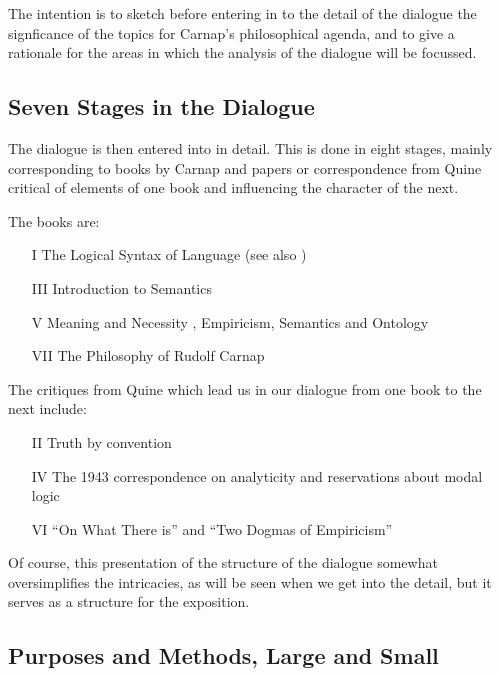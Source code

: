 The intention is to sketch before entering in to the detail of the dialogue
the signficance of the topics for Carnap's philosophical agenda, and
to give a rationale for the areas in which the analysis of the dialogue
will be focussed.

\subsection{Seven Stages in the Dialogue}

The dialogue is then entered into in detail.
This is done in eight stages, mainly corresponding to books by Carnap
and papers or correspondence from Quine critical of elements of one
book and influencing the character of the next.

The books are:

\begin{itemize}
\item[I] The Logical Syntax of Language \cite{carnap34,carnap37} (see also \cite{carnap35})
\item[III] Introduction to Semantics \cite{carnap42}
\item[V] Meaning and Necessity \cite{carnap47}, Empiricism, Semantics and Ontology \cite{carnap50}
\item[VII] The Philosophy of Rudolf Carnap \cite{carnap63}
\end{itemize}

The critiques from Quine which lead us in our dialogue from one
book to the next include:

\begin{itemize}
\item[II] Truth by convention \cite{quine36}
\item[IV] The 1943 correspondence on analyticity \cite{carnap90} and reservations about modal logic \cite{quine43,quine47}
\item[VI] ``On What There is'' \cite{quine51} and ``Two Dogmas of Empiricism'' \cite{quine51b}
\end{itemize}

Of course, this presentation of the structure of the dialogue somewhat oversimplifies
the intricacies, as will be seen when we get into the detail, but it serves
as a structure for the exposition.

\subsection{Purposes and Methods, Large and Small}

